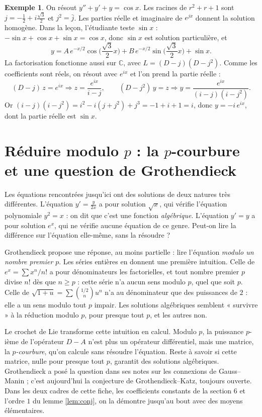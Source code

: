 \documentclass[11pt,a4paper]{article}
\theoremstyle{plain}
\theoremstyle{definition}
\newtheorem{exemple}[theoreme]{Exemple}
\theoremstyle{remark}
\newcommand{\Dx}{D}
\begin{document}
\begin{exemple}
On résout $y'' + y' + y = \cos x$. Les racines de $r^2 + r + 1$ sont $j = -\frac12 + i\frac{\sqrt3}{2}$ et $j^2 = \bar{j}$. Les parties réelle et imaginaire de $e^{jx}$ donnent la solution homogène. Dans la leçon, l'étudiante teste $\sin x$ : $-\sin x + \cos x + \sin x = \cos x$, donc $\sin x$ est solution particulière, et
\[
  y = A\,e^{-x/2}\cos\!\Big(\frac{\sqrt3}{2}x\Big) + B\,e^{-x/2}\sin\!\Big(\frac{\sqrt3}{2}x\Big) + \sin x .
\]
La factorisation fonctionne aussi sur $\mathbb{C}$, avec $L = (\Dx - j)(\Dx - j^2)$. Comme les coefficients sont réels, on résout avec $e^{ix}$ et l'on prend la partie réelle :
\[
  (\Dx - j)\,z = e^{ix} \Rightarrow z = \frac{e^{ix}}{i - j},
  \qquad
  (\Dx - j^2)\,y = z \Rightarrow y = \frac{e^{ix}}{(i-j)(i-j^2)} .
\]
Or $(i-j)(i-j^2) = i^2 - i(j + j^2) + j^3 = -1 + i + 1 = i$, donc $y = -i\,e^{ix}$, dont la partie réelle est $\sin x$.
\end{exemple}

\section{Réduire modulo \texorpdfstring{$p$}{p} : la \texorpdfstring{$p$}{p}-courbure et une question de Grothendieck}\label{sec:pcourbure}

Les équations rencontrées jusqu'ici ont des solutions de deux natures très différentes. L'équation $y' = \frac{y}{2x}$ a pour solution $\sqrt x$, qui vérifie l'équation polynomiale $y^2 = x$ : on dit que c'est une fonction \emph{algébrique}. L'équation $y' = y$ a pour solution $e^x$, qui ne vérifie aucune équation de ce genre. Peut-on lire la différence sur l'équation elle-même, sans la résoudre ?

Grothendieck propose une réponse, au moins partielle : lire l'équation \emph{modulo un nombre premier} $p$. Les séries entières en donnent une première intuition. Celle de $e^x = \sum x^n/n!$ a pour dénominateurs les factorielles, et tout nombre premier $p$ divise $n!$ dès que $n \geq p$ : cette série n'a aucun sens modulo $p$, quel que soit $p$. Celle de $\sqrt{1+u} = \sum \binom{1/2}{n} u^n$ n'a au dénominateur que des puissances de $2$ : elle a un sens modulo tout $p$ impair. Les solutions algébriques semblent « survivre » à la réduction modulo $p$, pour presque tout $p$, et les autres non.

Le crochet de Lie transforme cette intuition en calcul. Modulo $p$, la puissance $p$-ième de l'opérateur $\Dx - A$ n'est plus un opérateur différentiel, mais une matrice, la \emph{$p$-courbure}, qu'on calcule sans résoudre l'équation. Reste à savoir si cette matrice, nulle pour presque tout $p$, garantit des solutions algébriques. Grothendieck a posé la question dans ses notes sur les connexions de Gauss--Manin ; c'est aujourd'hui la conjecture de Grothendieck--Katz, toujours ouverte. Dans les deux cadres de cette fiche, les coefficients constants de la section 6 et l'ordre $1$ du lemme \ref{lem:conj}, on la démontre jusqu'au bout avec des moyens élémentaires.
\end{document}
